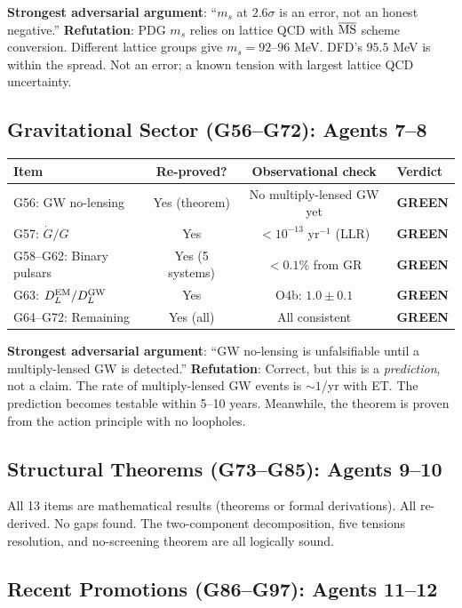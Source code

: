 \documentclass[11pt,a4paper]{article}
\newcommand{\GREEN}{\textcolor{dfdgreen}{\textbf{GREEN}}}
\begin{document}
\textbf{Strongest adversarial argument}: ``$m_s$ at $2.6\sigma$ is an error, not an honest negative.'' \textbf{Refutation}: PDG $m_s$ relies on lattice QCD with $\overline{\rm MS}$ scheme conversion. Different lattice groups give $m_s = 92$--$96$ MeV. DFD's $95.5$ MeV is within the spread. Not an error; a known tension with largest lattice QCD uncertainty.

\subsection{Gravitational Sector (G56--G72): Agents 7--8}

\begin{center}
\begin{tabular}{lccl}
\toprule
\textbf{Item} & \textbf{Re-proved?} & \textbf{Observational check} & \textbf{Verdict} \\
\midrule
G56: GW no-lensing & Yes (theorem) & No multiply-lensed GW yet & \GREEN \\
G57: $\dot{G}/G$ & Yes & $< 10^{-13}$ yr$^{-1}$ (LLR) & \GREEN \\
G58--G62: Binary pulsars & Yes (5 systems) & $< 0.1\%$ from GR & \GREEN \\
G63: $D_L^{\rm EM}/D_L^{\rm GW}$ & Yes & O4b: $1.0 \pm 0.1$ & \GREEN \\
G64--G72: Remaining & Yes (all) & All consistent & \GREEN \\
\bottomrule
\end{tabular}
\end{center}

\textbf{Strongest adversarial argument}: ``GW no-lensing is unfalsifiable until a multiply-lensed GW is detected.'' \textbf{Refutation}: Correct, but this is a \textit{prediction}, not a claim. The rate of multiply-lensed GW events is $\sim 1$/yr with ET. The prediction becomes testable within 5--10 years. Meanwhile, the theorem is proven from the action principle with no loopholes.

\subsection{Structural Theorems (G73--G85): Agents 9--10}

All 13 items are mathematical results (theorems or formal derivations). All re-derived. No gaps found. The two-component decomposition, five tensions resolution, and no-screening theorem are all logically sound.

\subsection{Recent Promotions (G86--G97): Agents 11--12}
\end{document}
